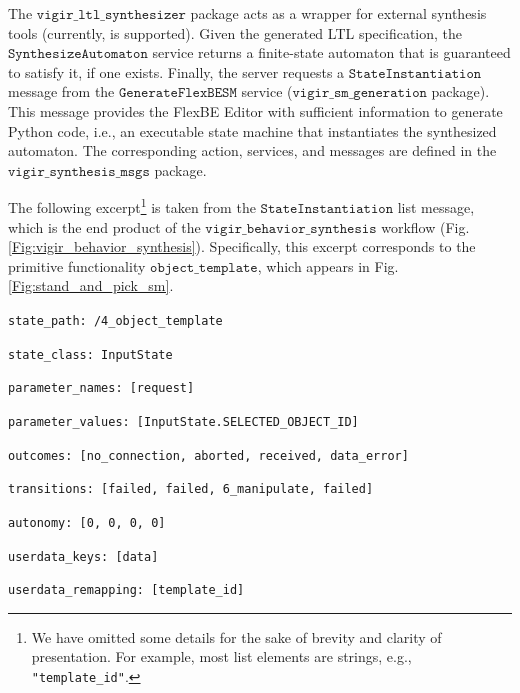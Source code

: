 The $\mathtt{vigir\_ltl\_synthesizer}$ package acts as a wrapper for external synthesis tools (currently, \cite{SLUGS} is supported).
Given the generated LTL specification, the $\mathtt{Synthesize Automaton}$ service returns a finite-state automaton that is guaranteed to satisfy it, if one exists.
Finally, the server requests a $\mathtt{State Instantiation}$ message from the $\mathtt{Generate FlexBE SM}$ service ($\mathtt{vigir\_sm\_generation}$ package).
This message provides the FlexBE Editor with sufficient information to generate Python code, i.e., an executable state machine that instantiates the synthesized automaton.
The corresponding action, services, and messages are defined in the $\mathtt{vigir\_synthesis\_msgs}$ package.

The following excerpt\footnote{We have omitted some details for the sake of brevity and clarity of presentation. For example, most list elements are strings, e.g., \scriptsize{\texttt{"template\_id"}}.}
 is taken from the $\mathtt{State Instantiation}$ list message, which is the end product of the $\mathtt{vigir\_behavior\_synthesis}$ workflow (Fig. \ref{Fig:vigir_behavior_synthesis}).
Specifically, this excerpt corresponds to the primitive functionality $\mathtt{object\_template}$, which appears in Fig. \ref{Fig:stand_and_pick_sm}.

\begin{description}
\setlength{\itemindent}{-.4in}
	\item \scriptsize{\texttt{state\_path: /4\_object\_template}}
	\item \scriptsize{\texttt{state\_class: InputState}}
	\item \scriptsize{\texttt{parameter\_names: [request]}}
	\item \scriptsize{\texttt{parameter\_values: [InputState.SELECTED\_OBJECT\_ID]}}
	\item \scriptsize{\texttt{outcomes: [no\_connection, aborted, received, data\_error]}}
	\item \scriptsize{\texttt{transitions: [failed, failed, 6\_manipulate, failed]}}
	\item \scriptsize{\texttt{autonomy: [0, 0, 0, 0]}}
	\item \scriptsize{\texttt{userdata\_keys: [data]}}
	\item \scriptsize{\texttt{userdata\_remapping: [template\_id]}}
\end{description}


